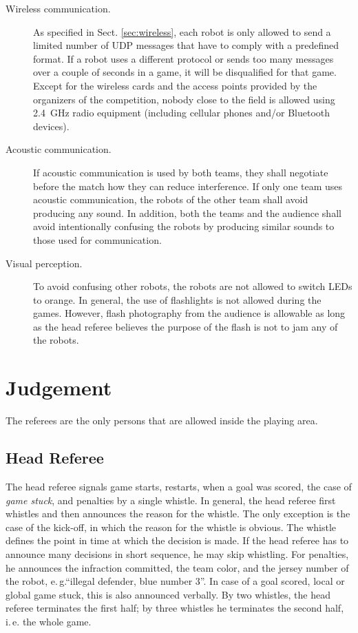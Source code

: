 \documentclass[12pt]{article}
\newcommand{\ie}{\mbox{i.\,e.}\xspace}
\newcommand{\eg}{\mbox{e.\,g.}\xspace}
\begin{document}
\begin{description}

\item[Wireless communication.] As specified in Sect. \ref{sec:wireless}, each robot is only allowed to send a limited number of UDP messages that have to comply with a predefined format. If a robot uses a different protocol or sends too many messages over a couple of seconds in a game, it will be disqualified for that game. Except for the wireless cards and the access points provided by the organizers of the competition, nobody close to the field is allowed using 2.4~GHz radio equipment (including cellular phones and/or Bluetooth devices).

\item[Acoustic communication.] If acoustic communication is used by both teams, they shall negotiate before the match how they can reduce interference. If only one team uses acoustic communication, the robots of the other team shall avoid producing any sound. In addition, both the teams and the audience shall avoid intentionally confusing the robots by producing similar sounds to those used for communication.

\item[Visual perception.] To avoid confusing other robots, the robots are not allowed to switch LEDs to orange. In general, the use of flashlights is not allowed during the games.  However, flash photography from the audience is allowable as long as the head referee believes the purpose of the flash is not to jam any of the robots.

\end{description}


\newpage


\section{Judgement}

The referees are the only persons that are allowed inside the playing area.

\subsection{Head Referee}
\label{sec:head_referee}
The head referee signals game starts, restarts, when a goal was scored, the case of \emph{game stuck}, and penalties by a single whistle. In general, the head referee first whistles and then announces the reason for the whistle. The only exception is the case of the kick-off, in which the reason for the whistle is obvious. The whistle defines the point in time at which the decision is made. If the head referee has to announce many decisions in short sequence, he may skip whistling. For penalties, he announces the infraction committed, the team color, and the jersey number of the robot, \eg ``illegal defender, blue number 3''. In case of a goal scored, local or global game stuck, this is also announced verbally. By two whistles, the head referee terminates the first half; by three whistles he terminates the second half, \ie the whole game.
\end{document}
